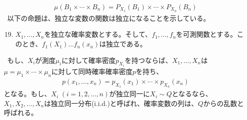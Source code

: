 \documentclass[a4j,12pt]{jarticle}
\begin{document}
\begin{align*}
\mu(B_{1} \times \cdots \times B_{n} ) = P_{X_{1}}(B_{1}) \times \cdots \times P_{X_{n}}(B_{n})
\end{align*}
\ 以下の命題は、独立な変数の関数は独立になることを示している。
\begin{enumerate}[label = 命題1.\arabic*]
\setcounter{enumi}{18}
\item $X_{1},\ldots,X_{n}$を独立な確率変数とする。そして、$f_{1},\ldots,f_{n}$を可測関数とする。このとき、$f_{1}(X_{1}) \ldots f_{n}(x_{n})$は独立である。
\end{enumerate}
\ もし、$X_{i}$が測度$\mu_{i}$に対して確率密度$p_{X_{i}}$を持つならば、$X_{1},\ldots,X_{n}$は$\mu = \mu_{1}\times\cdots \times \mu_{n}$に対して同時確率確率密度$p$を持ち、
\begin{align*}
p(x_{1},\ldots,x_{n}) = p_{X_{1}}(x_{1})\times\cdots \times p_{X_{n}}(x_{n})
\end{align*}
となる。もし、$X_{i} \; (i = 1,2,\ldots,n)$が独立同一に$X_{i} \sim Q$となるなら、$X_{1},X_{2},\ldots,X_{n}$は独立同一分布(i.i.d.)と呼ばれ、確率変数の列は、$Q$からの乱数と呼ばれる。
\end{document}

